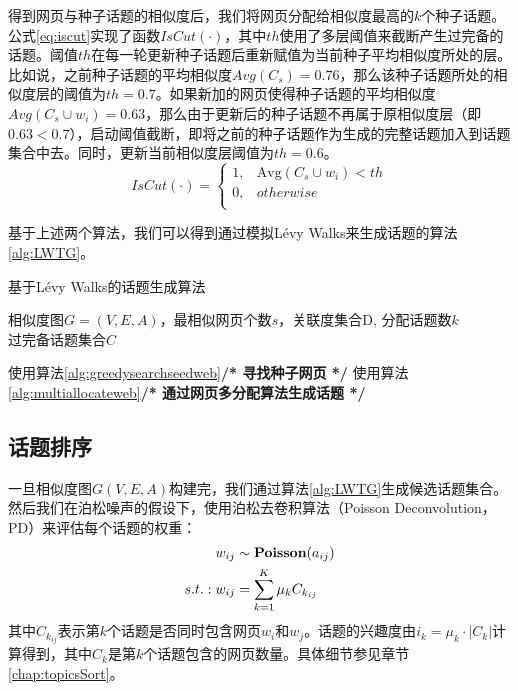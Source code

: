 得到网页与种子话题的相似度后，我们将网页分配给相似度最高的$k$个种子话题。公式\ref{eq:iscut}实现了函数$IsCut(\cdot)$，其中$th$使用了多层阈值来截断产生过完备的话题。阈值$th$在每一轮更新种子话题后重新赋值为当前种子平均相似度所处的层。比如说，之前种子话题的平均相似度$Avg(C_s)=0.76$，那么该种子话题所处的相似度层的阈值为$th=0.7$。如果新加的网页使得种子话题的平均相似度$Avg(C_s\cup w_i)=0.63$，那么由于更新后的种子话题不再属于原相似度层（即$0.63<0.7$），启动阈值截断，即将之前的种子话题作为生成的完整话题加入到话题集合中去。同时，更新当前相似度层阈值为$th=0.6$。
\begin{equation} \label{eq:iscut}
IsCut(\cdot) = 
\begin{cases}
1, & \text{Avg}(C_s\cup w_i) < th\\
0, & otherwise\\
\end{cases}
\end{equation}

基于上述两个算法，我们可以得到通过模拟L\'evy Walks来生成话题的算法\ref{alg:LWTG}。
\begin{algorithm}[!htbp]
    \caption{基于L\'evy Walks的话题生成算法}\label{alg:LWTG}
    \hspace*{0.02in}{\bf Input:}
    相似度图$G=(V,E,A)$，最相似网页个数$s$，关联度集合D, 分配话题数$k$\\
    \hspace*{0.02in}{\bf Output:}
    过完备话题集合$C$ 
    \begin{algorithmic}
            \State 使用算法\ref{alg:greedysearchseedweb}\qquad \qquad \textbf{/* 寻找种子网页 */}
            \State 使用算法\ref{alg:multiallocateweb}\qquad \qquad \textbf{/* 通过网页多分配算法生成话题 */}
        \EndFor
    \end{algorithmic}
\end{algorithm}

\subsection{话题排序}

一旦相似度图$G(V,E,A)$构建完，我们通过算法\ref{alg:LWTG}生成候选话题集合。然后我们在泊松噪声的假设下，使用泊松去卷积算法（Poisson Deconvolution，PD）来评估每个话题的权重：
\begin{align} \label{eq:poisondeconvolution}
w_{ij} &\sim \textbf{Poisson}(a_{ij})\notag\\
s.t.: w_{ij} &= \sum_{k=1}^{K}\mu_kC_{k_{ij}}
\end{align}
其中$C_{k_{ij}}$表示第$k$个话题是否同时包含网页$w_i$和$w_j$。话题的兴趣度由$i_k=\mu_k\cdot|C_k|$计算得到，其中$C_k$是第$k$个话题包含的网页数量。具体细节参见章节\ref{chap:topicsSort}。




